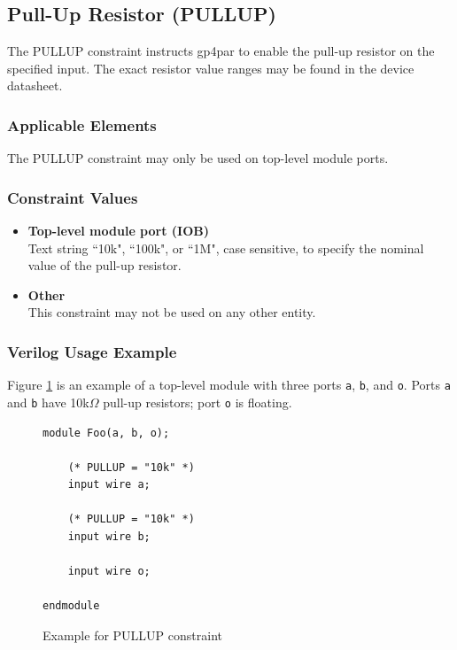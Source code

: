 \documentclass[11pt]{article}
\begin{document}

\pagebreak
\subsection{Pull-Up Resistor (PULLUP)}

The PULLUP constraint instructs gp4par to enable the pull-up resistor on the specified input. The exact resistor 
value ranges may be found in the device datasheet.

\subsubsection{Applicable Elements}
The PULLUP constraint may only be used on top-level module ports. 

\subsubsection{Constraint Values}
\begin{itemize}
\item {\bfseries Top-level module port (IOB)}\\
Text string ``10k", ``100k", or ``1M", case sensitive, to specify the nominal value of the pull-up resistor.
\item {\bfseries Other} \\
This constraint may not be used on any other entity.
\end{itemize}

\subsubsection{Verilog Usage Example}

Figure \ref{constraint-pullup} is an example of a top-level module with three ports \texttt{a}, \texttt{b}, and
\texttt{o}. Ports \texttt{a} and \texttt{b} have 10k$\Omega$ pull-up resistors; port \texttt{o} is floating.

\begin{figure}[h]
\begin{lstlisting}
module Foo(a, b, o);

	(* PULLUP = "10k" *)
	input wire a;

	(* PULLUP = "10k" *)
	input wire b;

	input wire o;
	
endmodule
\end{lstlisting}
\caption{Example for PULLUP constraint}
\label{constraint-pullup}
\end{figure}
\end{document}
